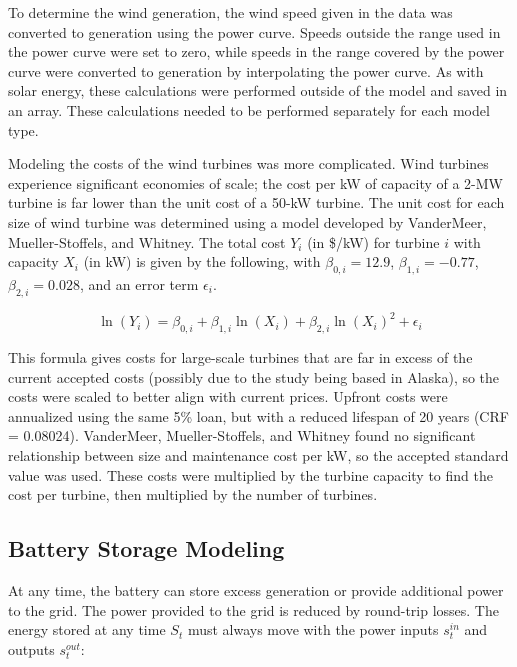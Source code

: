 \documentclass{article}
\begin{document}
To determine the wind generation, the wind speed given in the data was converted to generation using the power curve.  Speeds outside the range used in the power curve were set to zero, while speeds in the range covered by the power curve were converted to generation by interpolating the power curve.  As with solar energy, these calculations were performed outside of the model and saved in an array.  These calculations needed to be performed separately for each model type.

Modeling the costs of the wind turbines was more complicated.  Wind turbines experience significant economies of scale; the cost per kW of capacity of a 2-MW turbine is far lower than the unit cost of a 50-kW turbine.  The unit cost for each size of wind turbine was determined using a model developed by VanderMeer, Mueller-Stoffels, and Whitney.\cite{VanderMeer2017}  The total cost $Y_i$ (in \$/kW) for turbine $i$ with capacity $X_i$ (in kW) is given by the following, with $\beta_{0,i} = 12.9$, $\beta_{1,i} = -0.77$, $\beta_{2,i} = 0.028$, and an error term $\epsilon_i$.

\begin{equation}
\ln\left(Y_i\right) = \beta_{0,i} + \beta_{1,i} \ln\left(X_i\right) + \beta_{2,i} \ln\left(X_i\right)^2 + \epsilon_i
\label{eq:wind_scaling}
\end{equation}

This formula gives costs for large-scale turbines that are far in excess of the current accepted costs (possibly due to the study being based in Alaska), so the costs were scaled to better align with current prices.  Upfront costs were annualized using the same 5\% loan, but with a reduced lifespan of 20 years (CRF = 0.08024).  VanderMeer, Mueller-Stoffels, and Whitney found no significant relationship between size and maintenance cost per kW, so the accepted standard value was used.  These costs were multiplied by the turbine capacity to find the cost per turbine, then multiplied by the number of turbines.

\subsection{Battery Storage Modeling}

At any time, the battery can store excess generation or provide additional power to the grid.  The power provided to the grid is reduced by round-trip losses.  The energy stored at any time $S_t$ must always move with the power inputs $s^{in}_t$ and outputs $s^{out}_t$:
\end{document}
